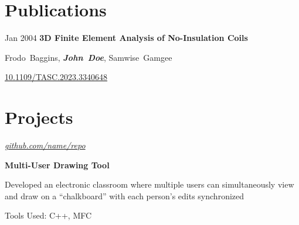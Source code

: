     
    \section{Publications}



        
        \begin{samepage}
            \begin{twocolentry}{
                Jan 2004
            }
                \textbf{3D Finite Element Analysis of No-Insulation Coils}

                \vspace{0.10 cm}

                \mbox{Frodo Baggins}, \mbox{\textbf{\textit{John Doe}}}, \mbox{Samwise Gamgee}
            \end{twocolentry}


            \vspace{0.10 cm}

            \begin{onecolentry}
        \href{https://doi.org/10.1109/TASC.2023.3340648}{10.1109/TASC.2023.3340648}
            \end{onecolentry}
        \end{samepage}


    
    \section{Projects}



        
        \begin{twocolentry}{
            
            
        \textit{\href{https://github.com/sinaatalay/rendercv}{github.com/name/repo}}}
            \textbf{Multi-User Drawing Tool}
        \end{twocolentry}

        \vspace{0.10 cm}
        \begin{onecolentry}
            \begin{highlights}
                \item Developed an electronic classroom where multiple users can simultaneously view and draw on a ``chalkboard'' with each person's edits synchronized
                \item Tools Used: C++, MFC
            \end{highlights}
        \end{onecolentry}


